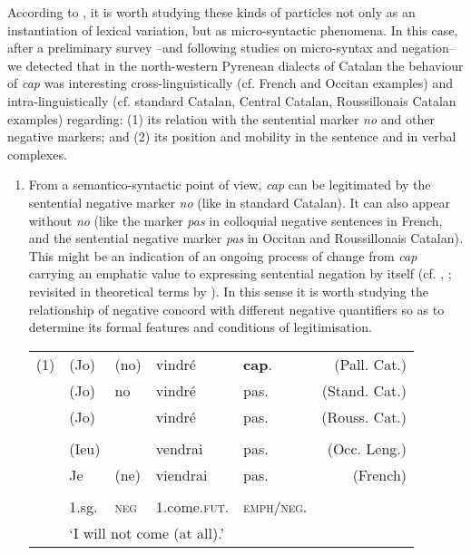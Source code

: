 \documentclass[output=paper]{LSP/langsci}
\begin{document}
According to \citet{rigau_mirative_2012}, it is worth studying these kinds of particles not only as an instantiation of lexical variation, but as micro-syntactic phenomena. In this case, after a preliminary survey –and following \citet{cornips_field_2007} studies on micro-syntax and negation– we detected that in the north-western Pyrenean dialects of Catalan the behaviour of \textit{cap} was interesting cross-linguistically (cf. French and Occitan examples) and intra-linguistically (cf. standard Catalan, Central Catalan, Roussillonais Catalan examples) regarding: (1) its relation with the sentential marker \textit{no} and other negative markers; and (2) its position and mobility in the sentence and in verbal complexes. 

\begin{enumerate}
\item From a semantico-syntactic point of view, \textit{cap} can be legitimated by the sentential negative marker \textit{no }(like in standard Catalan). It can also appear without \textit{no }(like the marker \textit{pas }in colloquial negative sentences in French, and the sentential negative marker \textit{pas }in Occitan and Roussillonais Catalan)\textit{. }This might be an indication of an ongoing process of change from \textit{cap }carrying an emphatic value to expressing sentential negation by itself (cf. \textit{}, \citealt{jespersen_negation_1917}; revisited in theoretical terms by \citealt{roberts_diachronic_2007,schwenter_fine_2006}). In this sense it is worth studying the relationship of negative concord with different negative quantifiers so as to determine its formal features and conditions of legitimisation.

\begin{tabular}{lllllr}
(1) 
& {(Jo)} & (no) & vindré & \textbf{cap}. & {(Pall. Cat.)}\\
& {(Jo)} & no   & vindré & pas. & {(Stand. Cat.)}\\
& {(Jo)} &      & vindré & pas. & {(Rouss. Cat.)}\\
& & & & & \\
& {(Ieu)}&      & vendrai & pas. & {(Occ. Leng.)}\\
& {Je}   &{(ne)}& viendrai & pas. & {(French)}\\
& & & & & \\
&{1.sg.} & \textsc{neg} & 1.come.\textsc{fut}. & {\textsc{emph}/\textsc{neg}}. & \\
& \multicolumn{5}{l}{‘I will not come (at all).’}\\
\end{tabular}


\end{enumerate}
\end{document}
